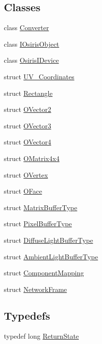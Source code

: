 \subsection*{Classes}
\begin{DoxyCompactItemize}
\item 
class \hyperlink{class_osiris_i_1_1_converter}{Converter}
\item 
class \hyperlink{class_osiris_i_1_1_i_osiris_object}{I\-Osiris\-Object}
\item 
class \hyperlink{class_osiris_i_1_1_osiris_i_device}{Osiris\-I\-Device}
\item 
struct \hyperlink{struct_osiris_i_1_1_u_v___coordinates}{U\-V\-\_\-\-Coordinates}
\item 
struct \hyperlink{struct_osiris_i_1_1_rectangle}{Rectangle}
\item 
struct \hyperlink{struct_osiris_i_1_1_o_vector2}{O\-Vector2}
\item 
struct \hyperlink{struct_osiris_i_1_1_o_vector3}{O\-Vector3}
\item 
struct \hyperlink{struct_osiris_i_1_1_o_vector4}{O\-Vector4}
\item 
struct \hyperlink{struct_osiris_i_1_1_o_matrix4x4}{O\-Matrix4x4}
\item 
struct \hyperlink{struct_osiris_i_1_1_o_vertex}{O\-Vertex}
\item 
struct \hyperlink{struct_osiris_i_1_1_o_face}{O\-Face}
\item 
struct \hyperlink{struct_osiris_i_1_1_matrix_buffer_type}{Matrix\-Buffer\-Type}
\item 
struct \hyperlink{struct_osiris_i_1_1_pixel_buffer_type}{Pixel\-Buffer\-Type}
\item 
struct \hyperlink{struct_osiris_i_1_1_diffuse_light_buffer_type}{Diffuse\-Light\-Buffer\-Type}
\item 
struct \hyperlink{struct_osiris_i_1_1_ambient_light_buffer_type}{Ambient\-Light\-Buffer\-Type}
\item 
struct \hyperlink{struct_osiris_i_1_1_component_mapping}{Component\-Mapping}
\item 
struct \hyperlink{struct_osiris_i_1_1_network_frame}{Network\-Frame}
\end{DoxyCompactItemize}
\subsection*{Typedefs}
\begin{DoxyCompactItemize}
\item 
typedef long \hyperlink{namespace_osiris_i_a8f53bf938dc75c65c6a529694514013e}{Return\-State}
\end{DoxyCompactItemize}
